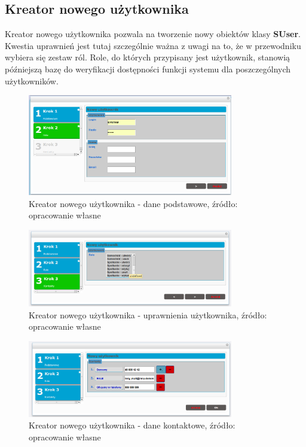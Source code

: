 \subsection{Kreator nowego użytkownika}
	Kreator nowego użytkownika pozwala na tworzenie nowy obiektów klasy \textbf{SUser}. Kwestia uprawnień jest tutaj szczególnie ważna z uwagi na to, że w przewodniku wybiera się zestaw ról. Role, do których przypisany jest użytkownik, stanowią późniejszą bazę do weryfikacji dostępności funkcji systemu dla poszczególnych użytkowników. 
	\begin{figure}[th]
		\centering
		\includegraphics[width=0.8\textwidth]{images/newUser-basic}
		\caption[Kreator nowego użytkownika - dane podstawowe]{
			Kreator nowego użytkownika - dane podstawowe, źródło: opracowanie własne	
		}
		\label{app:newUser_basic}
	\end{figure}	
	\begin{figure}[H]
		\centering
		\includegraphics[width=0.8\textwidth]{images/newUser-roles}
		\caption[Kreator nowego użytkownika - uprawnienia użytkownika]{
			Kreator nowego użytkownika - uprawnienia użytkownika, źródło: opracowanie własne
		}
		\label{app:newUser_roles}
	\end{figure}	
	\begin{figure}[th]
		\centering
		\includegraphics[width=0.8\textwidth]{images/newUser-contacts}
		\caption[Kreator nowego użytkownika - dane kontaktowe]{
			Kreator nowego użytkownika - dane kontaktowe, źródło: opracowanie własne
		}
		\label{app:newUser_contacts}
	\end{figure}	

